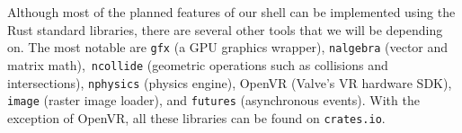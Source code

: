 \documentclass[titlepage,12pt]{article}
\begin{document}
Although most of the planned features of our shell can be implemented using the
Rust standard libraries, there are several other tools that we will be depending
on.  The most notable are \texttt{gfx} (a GPU graphics wrapper),
\texttt{nalgebra} (vector and matrix math),\ \texttt{ncollide} (geometric
operations such as collisions and intersections), \texttt{nphysics} (physics
engine), OpenVR (Valve's VR hardware SDK), \texttt{image} (raster image loader), and
\texttt{futures} (asynchronous events). With the exception of OpenVR, all these libraries
can be found on \texttt{crates.io}.
\end{document}
